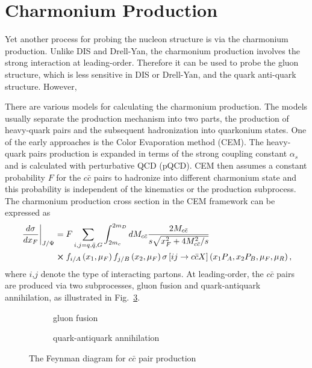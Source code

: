 \section{Charmonium Production}
\label{sec:jpsi}
Yet another process for probing the nucleon structure is via the charmonium production\cite{peng1995,chang2020}.
Unlike DIS and Drell-Yan, the charmonium production involves the strong interaction
at leading-order. Therefore it can be used to probe the gluon structure, which is 
less sensitive in DIS or Drell-Yan, and the quark anti-quark structure. However, 

There are various models for calculating the charmonium production. The models 
usually separate the production mechanism into two parts, the production of 
heavy-quark pairs and the subsequent hadronization into quarkonium states. One 
of the early approaches is the Color Evaporation method (CEM)\cite{einhorn1975,bodwin1995,bodwin1997}.
The heavy-quark pairs production is expanded in terms of the strong coupling 
constant $\alpha_s$ and is calculated with perturbative QCD (pQCD). CEM then 
assumes a constant probability $F$ for the $c\bar{c}$ pairs to hadronize into 
different charmonium state and this probability is independent of the kinematics 
or the production subprocess. The charmonium production cross section in the CEM 
framework can be expressed as
\begin{equation}
    \begin{split}
        \left.\frac{d\sigma}{dx_F}\right|_{J/\Psi} &= F \sum_{i,j = q,\bar{q},G}\int^{2m_D}_{2m_c} dM_{c\bar{c}}  \frac{2M_{c\bar{c}}}{s\sqrt{x_F^2+4M_{c\bar{c}}^2/s}}\\
        &\cross f_{i/A}\left(x_1,\mu_F\right)f_{j/B}\left(x_2,\mu_F\right)\sigma\left[ij\rightarrow c\bar{c}X\right]\left(x_1P_A,x_2P_B,\mu_F,\mu_R \right),
    \end{split}
\end{equation}
where $i$,$j$ denote the type of interacting partons. At leading-order, the 
$c\bar{c}$ pairs are produced via two subprocesses, gluon fusion and 
quark-antiquark annihilation, as illustrated in Fig.\ \ref{fig:charmonium}.
\begin{figure}[htpb!]
    \centering
    \begin{subfigure}{0.4\linewidth}
        \begin{subfigure}{\linewidth}
        
        \end{subfigure}
        \begin{subfigure}{\linewidth}
        
        \end{subfigure}
        \caption{gluon fusion\label{subfig:gluon}}
    \end{subfigure}
    \quad
    \begin{subfigure}{0.4\linewidth}
    
    \caption{quark-antiquark annihilation\label{subfig:qqbar}}
    \end{subfigure}
    \caption{The Feynman diagram for $c\bar{c}$ pair production}
    \label{fig:charmonium}
\end{figure}
